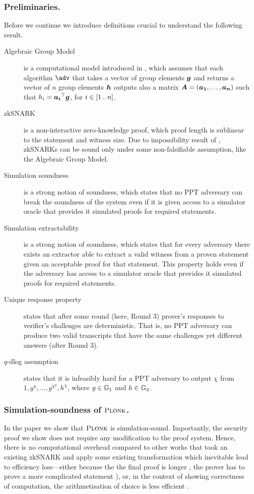 \documentclass[runningheads,11pt]{llncs}
\let\spvec\vec
\let\vec\accentvec
\let\vec\spvec
\def\vec#1{\mathchoice{\mbox{\boldmath$\displaystyle#1$}}
	{\mbox{\boldmath$\textstyle#1$}}
	{\mbox{\boldmath$\scriptstyle#1$}}
	{\mbox{\boldmath$\scriptscriptstyle#1$}}}
\begin{document}
	\subsubsection*{Preliminaries.}
	Before we continue we introduce definitions crucial to understand the following result. 
	\begin{description}
		\item[Algebraic Group Model] is a computational model introduced in \cite{C:FucKilLos18}, which assumes that each algorithm $\adv$ that takes a vector of group elements $\vec{g}$ and returns a vector of $n$ group elements $\vec{h}$ outputs also a matrix $\vec{A} = (\vec{a_1}, \ldots, \vec{a_n})$ such that $h_i = \vec{a_i}^\top \vec{g}$, for $i \in [1 \, .. \, n]$.
		\item[zkSNARK] is a non-interactive zero-knowledge proof, which proof length is sublinear to the statement and witness size. Due to impossibility result of \cite{STOC:GenWic11}, zkSNARKs can be sound only under some non-falsifiable assumption, like the Algebraic Group Model.
		\item[Simulation soundness] is a strong notion of soundness, which states that no PPT adversary can break the soundness of the system even if it is given access to a simulator oracle that provides it simulated proofs for required statements.
		\item[Simulation extractability] is a strong notion of soundness, which states that for every adversary there exists an extractor able to extract a valid witness from a proven statement given an acceptable proof for that statement. This property holds even if the adversary has access to a simulator oracle that provides it simulated proofs for required statements. 
		\item[Unique response property] states that after some round (here, Round 3) prover's responses to verifier's challenges are deterministic. That is, no PPT adversary can produce two valid transcripts that have the same challenges yet different answers (after Round 3).
		\item[$q$-dlog assumption] states that it is infeasibly hard for a PPT adversary to output $\chi$ from $1, g^{\chi}, \ldots, g^{\chi^q}, h^{\chi}$, where $g \in \mathbb{G}_1$ and $h \in \mathbb{G}_2$.
	\end{description}
	
	\subsubsection*{Simulation-soundness of $\textsc{Plonk}$.}
	In the paper we show that $\textsc{Plonk}$ is simulation-sound. 
	Importantly, the security proof we show does not require any modification to the proof system. 
	Hence, there is no computational overhead compared to other works that took an existing zkSNARK and apply some existing transformation which inevitable lead to efficiency loss---either because the the final proof is longer \cite{EPRINT:BowGab18}, the prover has to prove a more complicated statement \cite{ASIACCS:DerSla18,EPRINT:AbdRamSla20}), or, in the context of showing correctness of computation, the arithmetisation of choice is less efficient \cite{C:GroMal17}.
	
\end{document}
